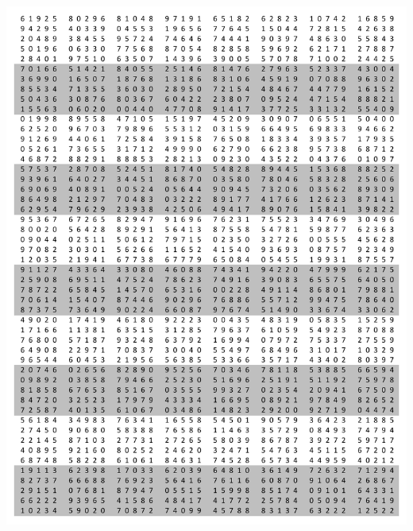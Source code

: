 \documentclass{article}
\begin{document}
\vfill

\includegraphics[scale=0.7]{RandNumbers.pdf}

\pagebreak
\end{document}
